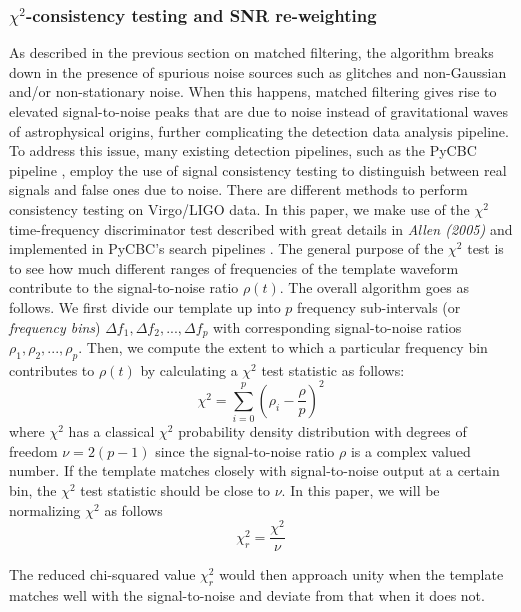 \documentclass[preprint,
letterpaper,
 amsmath,amssymb,
 aps,
]{revtex4-2}
\begin{document}
\subsubsection{$\chi^2$-consistency testing and SNR re-weighting} \label{chisqaured}

As described in the previous section on matched filtering, the algorithm breaks down in the presence of spurious noise sources such as glitches and non-Gaussian and/or non-stationary noise. When this happens, matched filtering gives rise to elevated signal-to-noise peaks that are due to noise instead of gravitational waves of astrophysical origins, further complicating the detection data analysis pipeline. To address this issue, many existing detection pipelines, such as the PyCBC pipeline \cite{veto}, employ the use of signal consistency testing to distinguish between real signals and false ones due to noise. There are different methods to perform consistency testing on Virgo/LIGO data. In this paper, we make use of the $\chi^2$ time-frequency discriminator test described with great details in \textit{Allen (2005)} \cite{Allen_2005} and implemented in PyCBC's search pipelines \cite{pycbc}. The general purpose of the $\chi^2$ test is to see how much different ranges of frequencies of the template waveform contribute to the signal-to-noise ratio $\rho(t)$. The overall algorithm goes as follows. We first divide our template up into $p$ frequency sub-intervals (or\textit{ frequency bins}) $\Delta f_1,\Delta f_2,..., \Delta f_p$ with corresponding signal-to-noise ratios $\rho_1,\rho_2,...,\rho_p$. Then, we compute the extent to which a particular frequency bin contributes to $\rho(t)$ by calculating a $\chi^2$ test statistic as follows:
\begin{equation} 
    \chi^2 = \sum^p_{i=0}\left(\rho_i - \frac{\rho}{p}\right)^2
\end{equation}
where $\chi^2$ has a classical $\chi^2$ probability density distribution with degrees of freedom $\nu = 2(p-1)$ since the signal-to-noise ratio $\rho$ is a complex valued number. If the template matches closely with signal-to-noise output at a certain bin, the $\chi^2$ test statistic should be close to $\nu$. In this paper, we will be normalizing $\chi^2$ as follows 
\begin{equation}
    \chi^2_{r} = \frac{\chi^2}{\nu}
\end{equation}

The reduced chi-squared value $\chi^2_r$ would then approach unity when the template matches well with the signal-to-noise and deviate from that when it does not.
\end{document}
